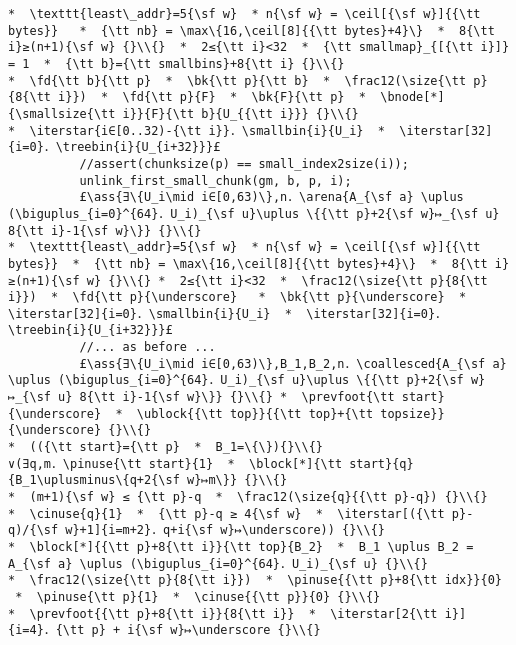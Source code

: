 \documentclass[10pt,a4paper,twoside]{report}
\makeatletter
\newcommand{\ml}[2][t]{\mbox{\mdseries\begin{tabular}[#1]{@{}L@{}}#2\end{tabular}}}
\newcommand{\ass}[1]{\ensuremath{{\color{blue}\left\{\ml[c]{#1}\right\}}}}
\renewcommand{\ceil}[2][]{\left\lceil{#2}\right\rceil_{#1}}
\newcommand{\iterstar}[2][]{\text{\LARGE $*$}^{#1}_{#2}}
\makeatother
\begin{document}
\begin{lstlisting}
*  \texttt{least\_addr}=5{\sf w}  * n{\sf w} = \ceil[{\sf w}]{{\tt bytes}}   *  {\tt nb} = \max\{16,\ceil[8]{{\tt bytes}+4}\}  *  8{\tt i}≥(n+1){\sf w} {}\\{}  *  2≤{\tt i}<32  *  {\tt smallmap}_{[{\tt i}]} = 1  *  {\tt b}={\tt smallbins}+8{\tt i} {}\\{}
*  \fd{\tt b}{\tt p}  *  \bk{\tt p}{\tt b}  *  \frac12(\size{\tt p}{8{\tt i}})  *  \fd{\tt p}{F}  *  \bk{F}{\tt p}  *  \bnode[*]{\smallsize{\tt i}}{F}{\tt b}{U_{{\tt i}}} {}\\{}
*  \iterstar{i∈[0..32)-{\tt i}}．\smallbin{i}{U_i}  *  \iterstar[32]{i=0}．\treebin{i}{U_{i+32}}}£ 
          //assert(chunksize(p) == small_index2size(i));
          unlink_first_small_chunk(gm, b, p, i);
          £\ass{∃\{U_i\mid i∈[0,63)\},n．\arena{A_{\sf a} \uplus (\biguplus_{i=0}^{64}．U_i)_{\sf u}\uplus \{{\tt p}+2{\sf w}↦_{\sf u} 8{\tt i}-1{\sf w}\}} {}\\{}
*  \texttt{least\_addr}=5{\sf w}  * n{\sf w} = \ceil[{\sf w}]{{\tt bytes}}  *  {\tt nb} = \max\{16,\ceil[8]{{\tt bytes}+4}\}  *  8{\tt i}≥(n+1){\sf w} {}\\{} *  2≤{\tt i}<32  *  \frac12(\size{\tt p}{8{\tt i}})  *  \fd{\tt p}{\underscore}   *  \bk{\tt p}{\underscore}  *  \iterstar[32]{i=0}．\smallbin{i}{U_i}  *  \iterstar[32]{i=0}．\treebin{i}{U_{i+32}}}£
          //... as before ...
          £\ass{∃\{U_i\mid i∈[0,63)\},B_1,B_2,n．\coallesced{A_{\sf a} \uplus (\biguplus_{i=0}^{64}．U_i)_{\sf u}\uplus \{{\tt p}+2{\sf w}↦_{\sf u} 8{\tt i}-1{\sf w}\}} {}\\{} *  \prevfoot{\tt start}{\underscore}  *  \ublock{{\tt top}}{{\tt top}+{\tt topsize}}{\underscore} {}\\{}
*  (({\tt start}={\tt p}  *  B_1=\{\}){}\\{}
∨(∃q,m．\pinuse{\tt start}{1}  *  \block[*]{\tt start}{q}{B_1\uplusminus\{q+2{\sf w}↦m\}} {}\\{}
*  (m+1){\sf w} ≤ {\tt p}-q  *  \frac12(\size{q}{{\tt p}-q}) {}\\{}
*  \cinuse{q}{1}  *  {\tt p}-q ≥ 4{\sf w}  *  \iterstar[({\tt p}-q)/{\sf w}+1]{i=m+2}．q+i{\sf w}↦\underscore)) {}\\{}
*  \block[*]{{\tt p}+8{\tt i}}{\tt top}{B_2}  *  B_1 \uplus B_2 = A_{\sf a} \uplus (\biguplus_{i=0}^{64}．U_i)_{\sf u} {}\\{}
*  \frac12(\size{\tt p}{8{\tt i}})  *  \pinuse{{\tt p}+8{\tt idx}}{0}  *  \pinuse{\tt p}{1}  *  \cinuse{{\tt p}}{0} {}\\{}
*  \prevfoot{{\tt p}+8{\tt i}}{8{\tt i}}  *  \iterstar[2{\tt i}]{i=4}．{\tt p} + i{\sf w}↦\underscore {}\\{}

\end{lstlisting}
\end{document}
